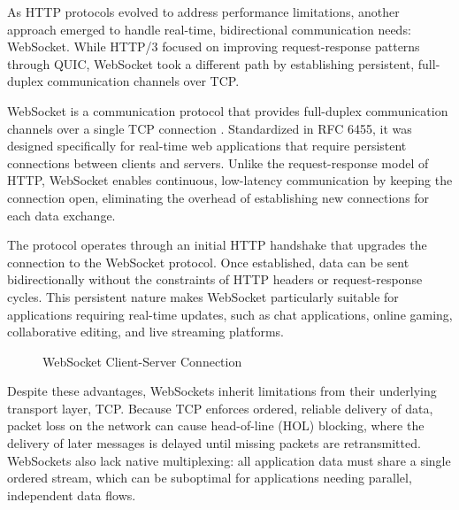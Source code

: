 As HTTP protocols evolved to address performance limitations, another approach emerged to handle real-time, bidirectional communication needs: WebSocket. While HTTP/3 focused on improving request-response patterns through QUIC, WebSocket took a different path by establishing persistent, full-duplex communication channels over TCP.

WebSocket is a communication protocol that provides full-duplex communication channels over a single TCP connection \cite{rfc6455}. Standardized in RFC 6455, it was designed specifically for real-time web applications that require persistent connections between clients and servers. Unlike the request-response model of HTTP, WebSocket enables continuous, low-latency communication by keeping the connection open, eliminating the overhead of establishing new connections for each data exchange.

The protocol operates through an initial HTTP handshake that upgrades the connection to the WebSocket protocol. Once established, data can be sent bidirectionally without the constraints of HTTP headers or request-response cycles. This persistent nature makes WebSocket particularly suitable for applications requiring real-time updates, such as chat applications, online gaming, collaborative editing, and live streaming platforms.


\begin{figure}[h]
\centering
{}
\caption{WebSocket Client-Server Connection}
\label{fig:websocket}
\end{figure}
Despite these advantages, WebSockets inherit limitations from their underlying transport layer, TCP. Because TCP enforces ordered, reliable delivery of data, packet loss on the network can cause head-of-line (HOL) blocking, where the delivery of later messages is delayed until missing packets are retransmitted. WebSockets also lack native multiplexing: all application data must share a single ordered stream, which can be suboptimal for applications needing parallel, independent data flows.

